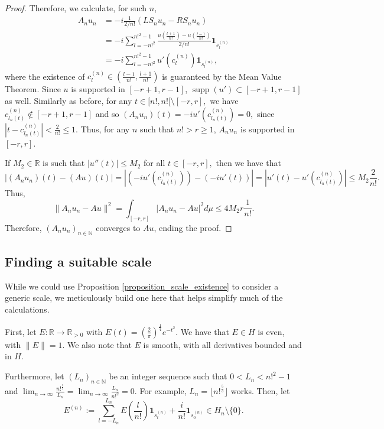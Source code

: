 \documentclass{amsart}
\theoremstyle{definition}
\theoremstyle{remark}
\begin{document}
\begin{proof}
	Therefore, we calculate, for such $n$,
	\begin{align*}
		A_nu_n &=-i\frac{1}{2/n!}(LS_n u_n-RS_n u_n)\\
		&=-i\sum_{l=-n!^2}^{n!^2-1}\frac{u(\frac{l+1}{n!})-u(\frac{l-1}{n!})}{2/n!}\mathbf{1}_{s_l^{(n)}}\\
		&=-i\sum_{l=-n!^2}^{n!^2-1} u'(c_l^{(n)})\mathbf{1}_{s_l^{(n)}},
	\end{align*}
	where the existence of $c_l^{(n)}\in(\frac{l-1}{n!},\frac{l+1}{n!})$ is guaranteed by the Mean Value Theorem. Since $u$ is supported in $[-r+1,r-1]$, $\operatorname{supp}(u')\subset [-r+1,r-1]$ as well. Similarly as before, for any $t\in[n!,n![\setminus [-r,r],$ we have $c_{l_n(t)}^{(n)}\notin[-r+1,r-1]$ and so $(A_nu_n)(t)=-iu'(c_{l_n(t)}^{(n)})=0,$  since $|t-c_{l_n(t)}^{(n)}|<\frac{2}{n!}\leq 1$. Thus, for any $n$ such that $n!> r\geq 1$, $A_nu_n$ is supported in $[-r,r].$
	
	If $M_2\in\mathbb{R}$ is such that $|u''(t)|\leq M_2$ for all $t\in[-r,r],$ then we have that $$|(A_nu_n)(t)-(Au)(t)|=|(-iu'(c_{l_n(t)}^{(n)}))- (-iu'(t))|=|u'(t)-u'(c_{l_n(t)}^{(n)})|\leq M_2\frac{2}{n!}.$$ Thus, $$\|A_nu_n-Au\|^2=\int_{[-r,r]}|A_nu_n-Au|^2d\mu\leq 4M_2r\frac{1}{n!}.$$ Therefore, $(A_n u_n)_{n\in\mathbb{N}}$ converges to $Au$, ending the proof.
\end{proof}

\subsection{Finding a suitable scale}\label{subsection_differential_scale} While we could use Proposition \ref{proposition_scale_existence} to consider a generic scale, we meticulously build one here that helps simplify much of the calculations.

First, let $E:\mathbb{R}\rightarrow\mathbb{R}_{>0}$ with $E(t)=\left(\frac{2}{\pi}\right)^{\frac{1}{4}}e^{-t^2}.$ We have that $E\in H$ is even, with $\|E\|=1.$ We also note that $E$ is smooth, with all derivatives bounded and in $H$. %

Furthermore, let $(L_n)_{n\in\mathbb{N}}$ be an integer sequence such that $0<L_n<n!^2-1$ and   $\lim_{n\rightarrow\infty}\frac{n!^{\frac{3}{2}}}{L_n}=\lim_{n\rightarrow\infty}\frac{L_n}{n!^2}=0.$ For example, $L_n=\lfloor n!^{\frac{5}{3}}\rfloor$ works. Then, let $$E^{(n)}:=\sum_{l=-L_n}^{L_n}E\left(\frac{l}{n!}\right)\mathbf{1}_{s_l^{(n)}}+\frac{i}{n!}\mathbf{1}_{s_0^{(n)}}\in H_n\setminus\{0\}.$$
\end{document}
